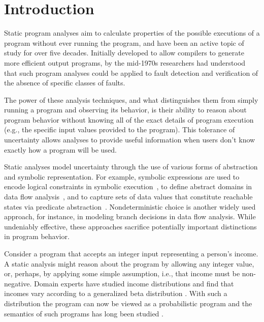 \section{Introduction}
\label{sec:introduction}

Static program analyses aim to calculate properties of 
the possible executions of a program without ever running the program,
and have been an active topic of study for over five decades.
Initially developed to allow compilers to generate more efficient
output programs, by the mid-1970s \cite{fosdick1976data} researchers had
understood that such program analyses could be applied to fault
detection and verification of the absence of specific classes of faults.

The power of these analysis techniques, and what distinguishes them from
simply running a program and observing its behavior, is their
ability to reason about program behavior without knowing all of the
exact details of program execution (e.g., the specific 
input values provided to the program).
This tolerance of uncertainty allows analyses
to provide useful information when users don't know exactly how
a program will be used.

Static analyses model uncertainty 
through the use of various forms of abstraction and symbolic representation.
For example, symbolic expressions are used to encode logical constraints 
in symbolic execution~\cite{king1976symbolic}, to define abstract domains
in data flow analysis~\cite{kildall1973unified,cousot1977abstract}, and to 
capture sets of data values that constitute reachable states via
predicate abstraction~\cite{graf1997predabs}.
Nondeterministic choice is another widely used approach,
for instance, in modeling branch decisions in data flow analysis.
While undeniably effective, these approaches sacrifice potentially
important distinctions in program behavior.   

Consider a program that accepts an integer input representing
a person's income.  A static analysis might reason about the program
by allowing any integer value, or, perhaps, by applying
some simple assumption, i.e., that income must be non-negative.
Domain experts have studied income distributions and find that
incomes vary according to a generalized beta distribution 
\cite{mcdonald1984some,thurow1970analyzing}.  
With such a distribution the program can now be viewed as a probabilistic
program and the semantics of such programs has long been studied 
\cite{kozen1981semantics,kozen1983probabilistic,jones1990probabilistic,morgan1996probabilistic}.

